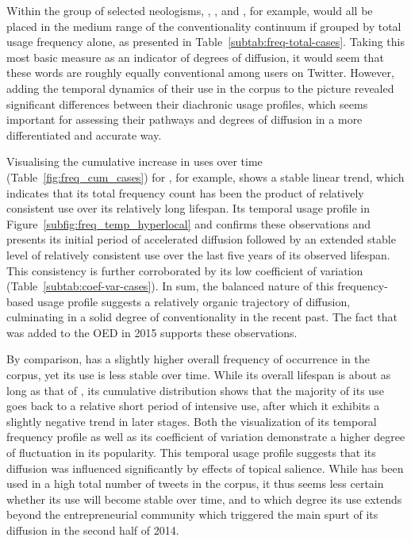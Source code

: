 \documentclass[
  a4paper,
  abstract=on,
  captions=tableabove
  ]{scrartcl}
\begin{document}
        Within the group of selected neologisms, , , and , for example, would all be placed in the medium range of the conventionality continuum if grouped by total usage frequency alone, as presented in Table~\ref{subtab:freq-total-cases}. Taking this most basic measure as an indicator of degrees of diffusion, it would seem that these words are roughly equally conventional among users on Twitter. However, adding the temporal dynamics of their use in the corpus to the picture revealed significant differences between their diachronic usage profiles, which seems important for assessing their pathways and degrees of diffusion in a more differentiated and accurate way.

        Visualising the cumulative increase in uses over time (Table~\ref{fig:freq_cum_cases}) for , for example, shows a stable linear trend, which indicates that its total frequency count has been the product of relatively consistent use over its relatively long lifespan. Its temporal usage profile in Figure~\ref{subfig:freq_temp_hyperlocal} and confirms these observations and presents its initial period of accelerated diffusion followed by an extended stable level of relatively consistent use over the last five years of its observed lifespan. This consistency is further corroborated by its low coefficient of variation (Table~\ref{subtab:coef-var-cases}). In sum, the balanced nature of this frequency-based usage profile suggests a relatively organic trajectory of diffusion, culminating in a solid degree of conventionality in the recent past. The fact that  was added to the OED in 2015 supports these observations.

        By comparison,  has a slightly higher overall frequency of occurrence in the corpus, yet its use is less stable over time. While its overall lifespan is about as long as that of , its cumulative distribution shows that the majority of its use goes back to a relative short period of intensive use, after which it exhibits a slightly negative trend in later stages. Both the visualization of its temporal frequency profile as well as its coefficient of variation demonstrate a higher degree of fluctuation in its popularity. This temporal usage profile suggests that its diffusion was influenced significantly by effects of topical salience. While  has been used in a high total number of tweets in the corpus, it thus seems less certain whether its use will become stable over time, and to which degree its use extends beyond the entrepreneurial community which triggered the main spurt of its diffusion in the second half of 2014.
\end{document}
